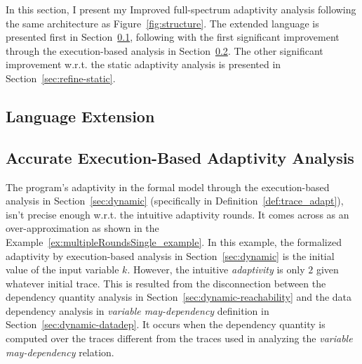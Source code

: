 In this section, I present my 
Improved full-spectrum adaptivity analysis 
following the same architecture as Figure~\ref{fig:structure}.
The extended language is presented first in Section~\ref{sec:refine-exe-language},
following with the first significant improvement
through the execution-based analysis in Section~\ref{sec:refine-exe}.
The other significant improvement w.r.t. the 
static adaptivity analysis is presented in Section~\ref{sec:refine-static}.
%
\subsection{Language Extension}
\label{sec:refine-exe-language}


\subsection{Accurate Execution-Based Adaptivity Analysis}
\label{sec:refine-exe}
%
% 
The program's adaptivity in the formal model through the execution-based analysis in Section~\ref{sec:dynamic}
(specifically in Definition~\ref{def:trace_adapt}), isn't precise enough w.r.t. the intuitive adaptivity rounds.
It comes across as an over-approximation 
as shown in the Example~\ref{ex:multipleRoundsSingle_example}.
In this example, the formalized adaptivity by execution-based analysis in Section~\ref{sec:dynamic} 
is the initial value of the input variable $k$.
However, the intuitive \emph{adaptivity} is only $2$ given whatever initial trace.
This is resulted from the
disconnection between the 
dependency quantity analysis in Section~\ref{sec:dynamic-reachability} and 
the data dependency analysis in \emph{variable may-dependency} definition in Section~\ref{sec:dynamic-datadep}.
It occurs when the 
dependency quantity is computed over the traces different from the traces used in 
analyzing the \emph{variable may-dependency} relation.


